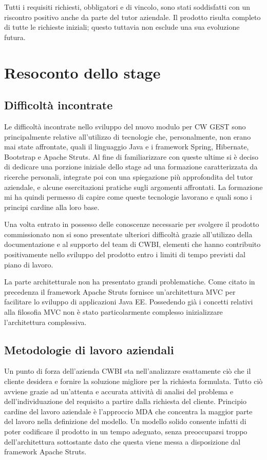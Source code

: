 \noindent Tutti i requisiti richiesti, obbligatori e di vincolo, sono stati soddisfatti con un riscontro positivo anche da parte del tutor aziendale. Il prodotto risulta completo di tutte le richieste iniziali; questo tuttavia non esclude una sua evoluzione futura.

\pagebreak

\section{Resoconto dello stage}

\subsection{Difficoltà incontrate}
Le difficoltà incontrate nello sviluppo del nuovo modulo per CW GEST sono principalmente relative all'utilizzo di tecnologie che, personalmente, non erano mai state affrontate, quali il linguaggio Java e i framework Spring, Hibernate, Bootstrap e Apache Struts. Al fine di familiarizzare con queste ultime si è deciso di dedicare una porzione iniziale dello stage ad una formazione caratterizzata da ricerche personali, integrate poi con una spiegazione più approfondita del tutor aziendale, e alcune esercitazioni pratiche sugli argomenti affrontati. La formazione mi ha quindi permesso di capire come queste tecnologie lavorano e quali sono i principi cardine alla loro base.  

\setlength{\parskip}{3ex}

\noindent Una volta entrato in possesso delle conoscenze necessarie per svolgere il prodotto commissionato non si sono presentate ulteriori difficoltà grazie all'utilizzo della documentazione e al supporto del team di CWBI, elementi che hanno contribuito positivamente nello sviluppo del prodotto entro i limiti di tempo previsti dal piano di lavoro.

\setlength{\parskip}{3ex}

\noindent La parte architetturale non ha presentato grandi problematiche. Come citato in precedenza il framework Apache Struts fornisce un'architettura MVC per facilitare lo sviluppo di applicazioni Java EE. Possedendo già i concetti relativi alla filosofia MVC non è stato particolarmente complesso inizializzare l'architettura complessiva. 

\subsection{Metodologie di lavoro aziendali}
Un punto di forza dell'azienda CWBI sta nell'analizzare esattamente ciò che il cliente desidera e fornire la soluzione migliore per la richiesta formulata. Tutto ciò avviene grazie ad un'attenta e accurata attività di analisi del problema e dell'individuazione del requisito a partire dalla richiesta del cliente. Principio cardine del lavoro aziendale è l'approccio MDA che concentra la maggior parte del lavoro nella definizione del modello. Un modello solido consente infatti di poter codificare il prodotto in un tempo adeguato, senza preoccuparsi troppo dell'architettura sottostante dato che questa viene messa a disposizione dal framework Apache Struts. 

